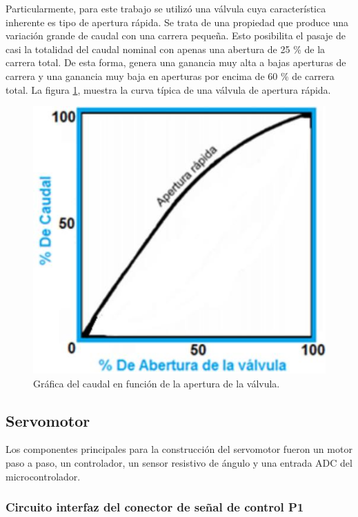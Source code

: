 Particularmente, para este trabajo se utilizó una válvula cuya característica inherente es tipo de apertura rápida. Se trata de una propiedad que produce una variación grande de caudal con una carrera pequeña. Esto posibilita el pasaje de casi la totalidad del caudal nominal con apenas una abertura de 25 \% de la carrera total.
De esta forma, genera una ganancia muy alta a bajas aperturas de carrera y una ganancia muy baja en aperturas por encima de 60 \% de carrera total. 
La figura \ref{fig:grafica caudal vs. apertura de valvula}, muestra la curva típica de una válvula de apertura rápida.
\begin{figure}[h]
\centering
\includegraphics[scale=.60]{./Figures/funcion-valvula.jpeg}
\caption{Gráfica del caudal en función de la apertura de la válvula.}
\label{fig:grafica caudal vs. apertura de valvula}
\end{figure}

\vspace{2cm}
\subsection{Servomotor}
\label{subsec:Servomotor}

Los componentes principales para la construcción del servomotor fueron un motor paso a paso, un controlador, un sensor resistivo de ángulo y una entrada ADC del microcontrolador.


\subsubsection{Circuito interfaz del conector de señal de control P1}

